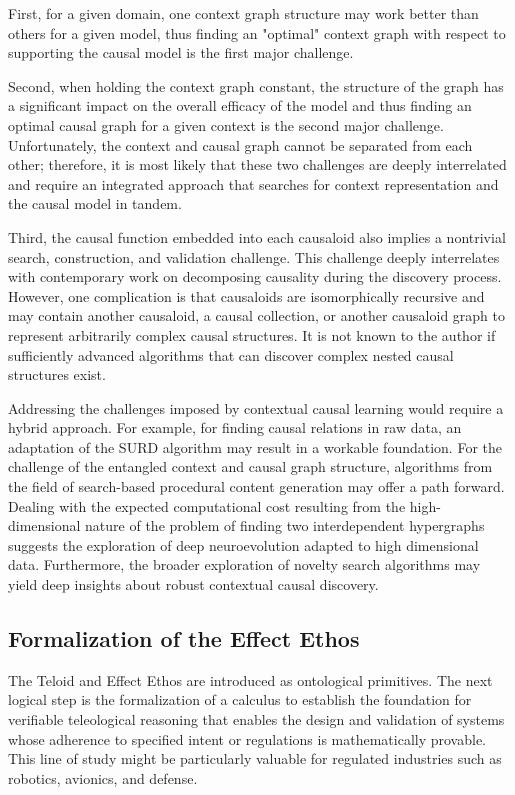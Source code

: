 First, for a given domain, one context graph structure may work better than others for a given model, thus finding an "optimal" context graph with respect to supporting the causal model is the first major challenge. 

 Second, when holding the context graph constant, the structure of the graph has a significant impact on the overall efficacy of the model and thus finding an optimal causal graph for a given context is the second major challenge. Unfortunately,  the context and causal graph cannot be separated from each other; therefore, it is most likely that these two challenges are deeply interrelated and require an integrated approach that searches for context representation and the causal model in tandem.  
 
Third, the causal function embedded into each causaloid also implies a nontrivial search, construction, and validation challenge. This challenge deeply interrelates with contemporary work on decomposing causality during the discovery process. However, one complication is that causaloids are isomorphically recursive and may contain another causaloid, a causal collection, or another causaloid graph to represent arbitrarily complex causal structures. It is not known to the author if sufficiently advanced algorithms that can discover complex nested causal structures exist. 


Addressing the challenges imposed by contextual causal learning would require a hybrid approach. For example, for finding causal relations in raw data, an adaptation of the SURD algorithm\cite{martinez2024decomposing} may result in a workable foundation. For the challenge of the entangled context and causal graph structure, algorithms from the field of search-based procedural content generation\cite{togelius2011search} may offer a path forward. Dealing with the expected computational cost resulting from the high-dimensional nature of the problem of finding two interdependent hypergraphs suggests the exploration of deep neuro\-evolution adapted to high dimensional data\cite{colas2020scaling}. Furthermore, the broader exploration of novelty search\cite{lehman2011abandoning} algorithms may yield deep insights about robust contextual causal discovery. 


\subsection{Formalization of the Effect Ethos}

The Teloid and Effect Ethos are introduced as ontological primitives. The next logical step is the formalization of a calculus to establish the foundation for verifiable teleological reasoning that enables the design and validation of systems whose adherence to specified intent or regulations is mathematically provable. This line of study might be particularly valuable for regulated industries such as robotics, avionics, and defense. 

